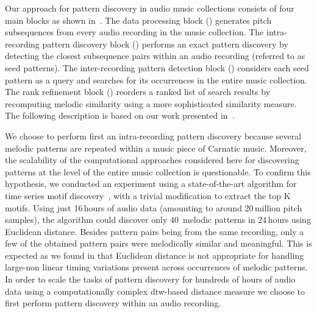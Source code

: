 Our approach for pattern discovery in audio music collections consists of four main blocks as shown in~. The data processing block () generates pitch subsequences from every audio recording in the music collection. The intra-recording pattern discovery block () performs an exact pattern discovery by detecting the closest subsequence pairs within an audio recording (referred to as seed patterns). The inter-recording pattern detection block () considers each seed pattern as a query and searches for its occurrences in the entire music collection. The rank refinement block () reorders a ranked list of search results by recomputing melodic similarity using a more sophisticated similarity measure. The following description is based on our work presented in~\cite{gulati_SITIS_2014}.

We choose to perform first an intra-recording pattern discovery because several melodic patterns are repeated within a music piece of Carnatic music. Moreover, the scalability of the computational approaches considered here for discovering patterns at the level of the entire music collection is questionable. To confirm this hypothesis, we conducted an experiment using a state-of-the-art algorithm for time series motif discovery~\citep{Mueen2009}, with a trivial modification to extract the top K motifs. Using just 16\,hours of audio data (amounting to around 20\,million pitch samples), the algorithm could discover only 40~melodic patterns in 24\,hours using Euclidean distance. Besides pattern pairs being from the same recording, only a few of the obtained pattern pairs were melodically similar and meaningful. This is expected as we found in  that Euclidean distance is not appropriate for handling large-non linear timing variations present across occurrences of melodic patterns. In order to scale the tasks of pattern discovery for hundreds of hours of audio data using a computationally complex \gls{dtw}-based distance measure we choose to first perform pattern discovery within an audio recording.

